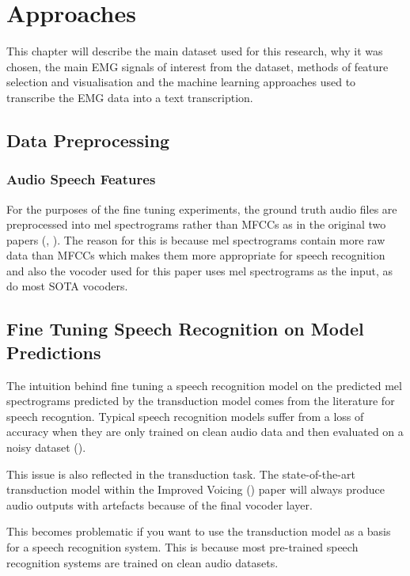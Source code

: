 \chapter{Approaches} \label{chap:approaches}

This chapter will describe the main dataset used for this research, why it was chosen,
the main EMG signals of interest from the dataset, methods of feature selection and
visualisation and the machine learning approaches used to transcribe the EMG data
into a text transcription.

\section{Data Preprocessing}

\subsection{Audio Speech Features}

For the purposes of the fine tuning experiments, the ground truth audio files
are preprocessed into mel spectrograms rather than MFCCs as in the original two papers
(\cite{gaddy2020digital}, \cite{gaddy2021improved}). The reason for this is because 
mel spectrograms contain more raw data than MFCCs which makes them more appropriate for
speech recognition and also the vocoder used for this paper uses mel spectrograms as the input,
as do most SOTA vocoders.

\section{Fine Tuning Speech Recognition on Model Predictions}

The intuition behind fine tuning a speech recognition model on the
predicted mel spectrograms predicted by the transduction model comes
from the literature for speech recogntion. Typical speech recognition models
suffer from a loss of accuracy when they are only trained on clean audio data
and then evaluated on a noisy dataset (\cite{DS2_original}).

This issue is also reflected in the transduction task. The state-of-the-art
transduction model within the Improved Voicing (\cite{gaddy2021improved}) paper
will always produce audio outputs with artefacts because of the final vocoder layer.

This becomes problematic if you want to use the transduction model as a basis for a
speech recognition system. This is because most pre-trained speech recognition systems
are trained on clean audio datasets.

